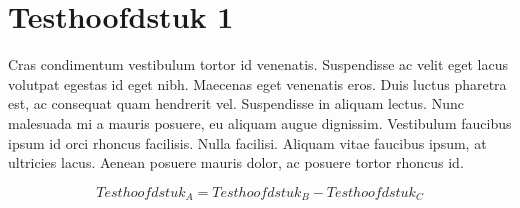 \chapter{Testhoofdstuk 1}

 Cras condimentum vestibulum tortor id venenatis. Suspendisse ac velit eget lacus volutpat egestas id eget nibh. Maecenas eget venenatis eros. Duis luctus pharetra est, ac consequat quam hendrerit vel. Suspendisse in aliquam lectus. Nunc malesuada mi a mauris posuere, eu aliquam augue dignissim. Vestibulum faucibus ipsum id orci rhoncus facilisis. Nulla facilisi. Aliquam vitae faucibus ipsum, at ultricies lacus. Aenean posuere mauris dolor, ac posuere tortor rhoncus id.

	\begin{mdframed}[backgroundcolor=grijs!40,shadow=false,roundcorner=8pt]
		$$Testhoofdstuk_A = Testhoofdstuk_B - Testhoofdstuk_C$$
	\end{mdframed}